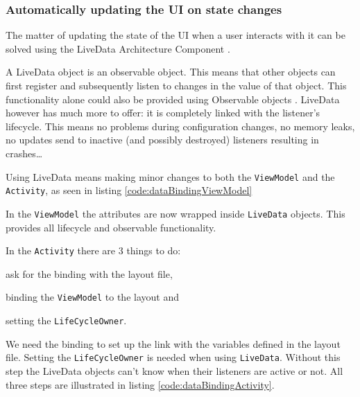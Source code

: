 \subsubsection{Automatically updating the UI on state changes}
The matter of updating the state of the UI when a user interacts with it can be solved using the LiveData Architecture Component \cite{liveData}.

A LiveData object is an observable object. This means that other objects can first register and subsequently listen to changes in the value of that object.
This functionality alone could also be provided using Observable objects \cite{observable}.
LiveData however has much more to offer: it is completely linked with the listener's lifecycle. This means no problems during configuration changes, no memory leaks, no updates send to inactive (and possibly destroyed) listeners resulting in crashes\ldots

Using LiveData means making minor changes to both the \lstinline!ViewModel! and the \lstinline!Activity!, as seen in listing \ref{code:dataBindingViewModel}

In the \lstinline!ViewModel! the attributes are now wrapped inside \lstinline!LiveData! objects.
This provides all lifecycle and observable functionality. 



In the \lstinline!Activity! there are 3 things to do:
\begin{inparaenum}[(i)]
	\item ask for the binding with the layout file,
	\item binding the \lstinline!ViewModel! to the layout and
	\item setting the \lstinline!LifeCycleOwner!.
\end{inparaenum}

We need the binding to set up the link with the variables defined in the layout file. 
Setting the \lstinline!LifeCycleOwner! is needed when using \lstinline!LiveData!. 
Without this step the LiveData objects can't know when their listeners are active or not. All three steps are illustrated in listing \ref{code:dataBindingActivity}.




